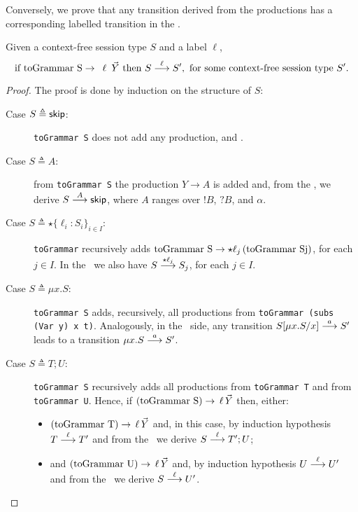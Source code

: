 Conversely, we prove that any transition derived from the productions
has a corresponding labelled transition in the \LTS.

\begin{lemma}
Given a context-free session type $S$ and a label $\ell$,
	\[ \text{if } \text{\lstinline{toGrammar S}} \rightarrow \enspace \ell \enspace
	 \vec Y \text{ then } S \LTSderives[\ell] S', \text{ for some context-free session type $S'$}.\]
\end{lemma}

\begin{proof}
	The proof is done by induction on the structure of $S$:
	\begin{description}
		\item[Case $S \triangleq \skipk$:] \lstinline{toGrammar S} does not
		     add any production, and .
		\item[Case $S \triangleq A$:] from \lstinline{toGrammar S} the
		     production $Y\rightarrow A$ is added and, from the \LTS, we derive
		     $S \LTSderives[A] \skipk$, where $A$ ranges over $!B$, $?B$,
		     and $\alpha$.
		\item[Case $S\triangleq \star \{\ell_i : S_i\}_{i\in I}$:]
		     \lstinline{toGrammar} recursively adds
		     $\text{\lstinline{toGrammar S}} \rightarrow \star \ell_j\,
		     \text{(\lstinline{toGrammar Sj})}$,
		     for each $j\in I$. In the \LTS\ we also have
		     $S \LTSderives[\star \ell_j] S_j$, for each $j\in I$.
		\item[Case $S\triangleq \mu x.S$:] \lstinline{toGrammar S} adds,
		     recursively, all productions from \linebreak \lstinline{toGrammar (subs (Var y) x t)}.
		     Analogously, in the \LTS\ side, any transition
		     $S[\mu x.S/x] \LTSderives[a] S'$ leads to a transition
		     $\mu x.S \LTSderives[a] S'$.
		\item[Case $S \triangleq T;U$:]   \lstinline{toGrammar S} recursively adds
		     all productions from   \lstinline{toGrammar T} and from
		     \lstinline{toGrammar U}. Hence, if
		     $\text{(\lstinline{toGrammar S})} \rightarrow \, \ell \, \vec Y$ then,
		     either:
		     \begin{itemize}
		     	\item $\text{(\lstinline{toGrammar T}}) \rightarrow \, \ell \, \vec Y$ and,
		     	      in this case, by induction hypothesis $T \LTSderives[\ell] T'$ and
		     	      from the \LTS\ we derive $S \LTSderives[\ell] T';U$;
		     	\item {} and $\text{(\lstinline{toGrammar U}}) \rightarrow \,
		     	      \ell \, \vec Y$ and, by induction hypothesis $U \LTSderives[\ell] U'$
		     	      and from the \LTS\ we derive $S \LTSderives[\ell] U'$.
		     \end{itemize}
	\end{description}
\end{proof}

